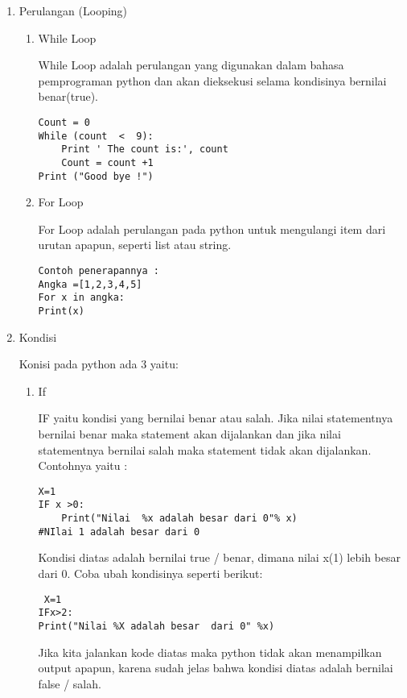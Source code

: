 \begin{enumerate}
\begin{verbatim}
\end{verbatim}

\item Perulangan (Looping)
\begin{enumerate}
\item While Loop
\par While Loop adalah perulangan yang digunakan dalam bahasa pemprograman python dan akan dieksekusi selama kondisinya bernilai benar(true).
\begin{verbatim}
Count = 0
While (count  <  9):
	Print ' The count is:', count
	Count = count +1
Print ("Good bye !")

\end{verbatim}

\item 	For Loop
\par For Loop adalah perulangan pada python untuk mengulangi item dari urutan apapun, seperti list atau string.
\begin{verbatim}
Contoh penerapannya :
Angka =[1,2,3,4,5]
For x in angka:
Print(x)
\end{verbatim}
\end{enumerate}

\item Kondisi
\par Konisi pada python ada 3 yaitu:
\begin{enumerate}
\item If
\par IF yaitu kondisi yang bernilai benar atau salah. Jika nilai statementnya bernilai benar maka statement akan dijalankan dan jika nilai statementnya bernilai salah maka statement tidak akan dijalankan. Contohnya yaitu :
\begin{verbatim}
X=1
IF x >0:
	Print("Nilai  %x adalah besar dari 0"% x)
#NIlai 1 adalah besar dari 0
\end{verbatim}
\par Kondisi diatas adalah bernilai true / benar, dimana nilai x(1) lebih besar dari 0. Coba ubah kondisinya seperti berikut:
\begin{verbatim}
 X=1
IFx>2:
Print("Nilai %X adalah besar  dari 0" %x)

\end{verbatim}
\par Jika kita jalankan kode diatas maka python tidak akan menampilkan output apapun, karena sudah jelas bahwa kondisi diatas adalah bernilai false / salah.


\end{enumerate}
\end{enumerate}

